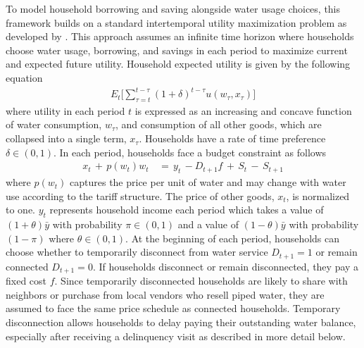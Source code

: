 \documentclass[12pt]{article}
\begin{document}
To model household borrowing and saving alongside water usage choices, this framework builds on a standard intertemporal utility maximization problem as developed by \cite{deaton1991saving}.  This approach assumes an infinite time horizon where households choose water usage, borrowing, and savings in each period to maximize current and expected future utility.  Household expected utility is given by the following equation
\begin{align}\label{eq:u}
E_t \Big[ \sum_{\tau = t}^{t-\tau} (1+\delta)^{t-\tau} u(w_{\tau},x_{\tau})   \Big]
\end{align}
where utility in each period $t$ is expressed as an increasing and concave function of water consumption, $w_{\tau}$, and consumption of all other goods, which are collapsed into a single term, $x_{\tau}$.  Households have a rate of time preference $\delta \in (0,1)$.  In each period, households face a budget constraint as follows
\begin{align}\label{eq:bc}
x_t \, + \, p(w_t) w_t \, &= \, y_t \, - D_{t+1} f  \, + \, S_t \, - \, S_{t+1}
\end{align}
where $p(w_t)$ captures the price per unit of water and may change with water use according to the tariff structure.  The price of other goods, $x_t$, is normalized to one.  $y_t$ represents household income each period which takes a value of $(1+\theta)\bar{y}$ with probability $\pi \in (0,1)$ and a value of $(1-\theta)\bar{y}$ with probability $(1-\pi)$ where $\theta  \in (0,1)$.  At the beginning of each period, households can choose whether to temporarily disconnect from water service $D_{t+1}=1$ or remain connected $D_{t+1}=0$.  If households disconnect or remain disconnected, they pay a fixed cost $f$.  Since temporarily disconnected households are likely to share with neighbors or purchase from local vendors who resell piped water, they are assumed to face the same price schedule as connected households.  Temporary disconnection allows households to delay paying their outstanding water balance, especially after receiving a delinquency visit as described in more detail below.  
\end{document}

